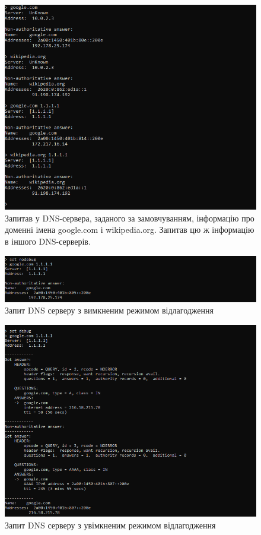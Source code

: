 \documentclass{article}
\begin{document}
\begin{normalsize}
\begin{figure}[H]
	\centering
	\includegraphics[width=\textwidth]{31}
	\caption{Запитав у DNS-сервера, заданого за замовчуванням, інформацію про доменні імена google.com і wikipedia.org. Запитав цю ж інформацію в іншого DNS-серверів.}
\end{figure}

\begin{figure}[H]
	\centering
	\includegraphics[width=\textwidth]{32}
	\caption{Запит DNS серверу з вимкненим режимом відлагодження}
\end{figure}

\begin{figure}[H]
	\centering
	\includegraphics[width=\textwidth]{33}
	\caption{Запит DNS серверу з увімкненим режимом відлагодження}
\end{figure}


\end{normalsize}
\end{document}
